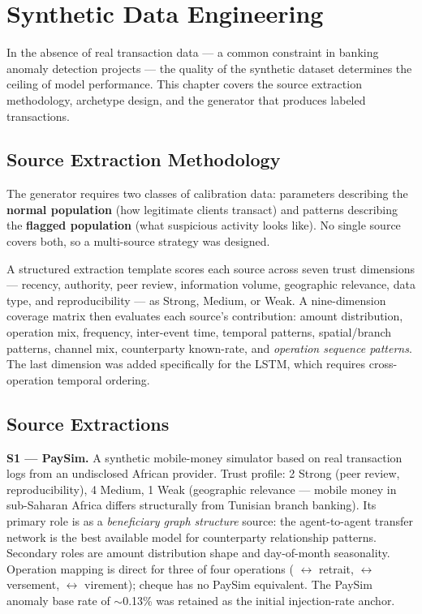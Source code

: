 \chapter{Synthetic Data Engineering}
\label{ch:synthetic}

In the absence of real transaction data --- a common constraint in banking anomaly detection projects --- the quality of the synthetic dataset determines the ceiling of model performance. This chapter covers the source extraction methodology, archetype design, and the generator that produces labeled transactions.

\section{Source Extraction Methodology}

The generator requires two classes of calibration data: parameters describing the \textbf{normal population} (how legitimate clients transact) and patterns describing the \textbf{flagged population} (what suspicious activity looks like). No single source covers both, so a multi-source strategy was designed.

A structured extraction template scores each source across seven trust dimensions --- recency, authority, peer review, information volume, geographic relevance, data type, and reproducibility --- as Strong, Medium, or Weak. A nine-dimension coverage matrix then evaluates each source's contribution: amount distribution, operation mix, frequency, inter-event time, temporal patterns, spatial/branch patterns, channel mix, counterparty known-rate, and \emph{operation sequence patterns}. The last dimension was added specifically for the LSTM, which requires cross-operation temporal ordering.

\section{Source Extractions}

\textbf{S1 --- PaySim.} A synthetic mobile-money simulator based on real transaction logs from an undisclosed African provider. Trust profile: 2 Strong (peer review, reproducibility), 4 Medium, 1 Weak (geographic relevance --- mobile money in sub-Saharan Africa differs structurally from Tunisian branch banking). Its primary role is as a \emph{beneficiary graph structure} source: the agent-to-agent transfer network is the best available model for counterparty relationship patterns. Secondary roles are amount distribution shape and day-of-month seasonality. Operation mapping is direct for three of four operations ( $\leftrightarrow$ retrait,  $\leftrightarrow$ versement,  $\leftrightarrow$ virement); cheque has no PaySim equivalent. The PaySim anomaly base rate of $\sim$0.13\% was retained as the initial injection-rate anchor.

